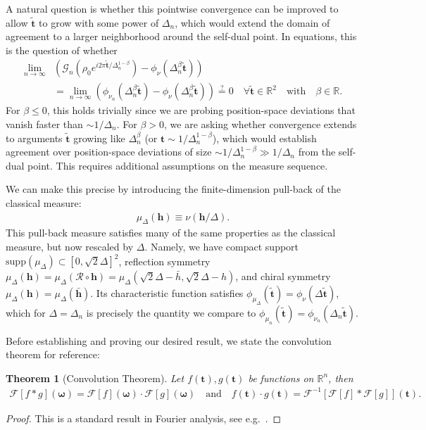 \documentclass[a4paper,11pt]{article}
\theoremstyle{plain}
\newtheorem{thm}{Theorem}[section]
\theoremstyle{definition}
\theoremstyle{remark}
\newcommand{\bs}[1]{\boldsymbol{#1}}
\newcommand{\ba}{\begin{equation} \begin{aligned}}
\newcommand{\ea}{\end{aligned} \end{equation}}
\newcommand{\De}{\Delta}
\begin{document}
A natural question is whether this pointwise convergence can be improved to allow $\tilde{\bs{t}}$ to grow with some power of $\De_n$, which would extend the domain of agreement to a larger neighborhood around the self-dual point. In equations, this is the question of whether
\ba
\lim_{n \to \infty} &\left(  \mathcal{G}_n(\rho_0 e^{i 2\pi \tilde{\bs{t}} / \De_n^{1-\beta} } )   - \phi_{\nu}(\De_n^{\beta}\tilde{\bs{t}})\right) \\ 
&=\lim_{n \to \infty} \left(  \phi_{\nu_n}(\De_n^{\beta}\tilde{ \bs{t}})  - \phi_{\nu}(\De_n^{\beta}\tilde{\bs{t}})\right)\stackrel{?}{=} 0 \quad \forall \tilde{\bs{t}} \in \mathbb{R}^2 \quad \text{with} \quad \beta \in \mathbb{R}.
\ea
For $\beta \leq0$, this holds trivially since we are probing position-space deviations that vanish faster than $\sim 1/\De_n$. For $\beta >0$, we are asking whether convergence extends to arguments $\tilde{\bs{t}}$ growing like $\De_n^{\beta}$ (or $\bs{t} \sim 1/\De_n^{1-\beta}$), which would establish agreement over position-space deviations of size $\sim 1/\De_n^{1-\beta} \gg 1/\De_n$ from the self-dual point. This requires additional assumptions on the measure sequence.

We can make this precise by introducing the finite-dimension pull-back of the classical measure:
\ba
\mu_{\De}(\bs{h}) \equiv \nu(\bs{h}/\De).
\ea
This pull-back measure satisfies many of the same properties as the classical measure, but now rescaled by $\Delta$. Namely, we have compact support $\mathrm{supp}(\mu_\Delta) \subset [0,\sqrt{2} \Delta]^2 $, reflection symmetry $\mu_\Delta(\bs{h}) = \mu_\Delta(\mathcal{R}\circ\bs{h}) = \mu_\Delta(\sqrt{2}\Delta - \bar{h},\sqrt{2}\De - h)$, and chiral symmetry $\mu_\Delta(\bs{h}) = \mu_\Delta(\bar{\bs{h}})$. Its characteristic function satisfies $\phi_{\mu_\De}(\tilde{\bs{t}}) = \phi_\nu(\De \tilde{\bs{t}})$, which for $\De = \De_n$ is precisely the quantity we compare to $\phi_{\mu_n}(\tilde{\bs{t}}) = \phi_{\nu_n}(\De_n \tilde{\bs{t}})$. 

Before establishing and proving our desired result, we state the convolution theorem for reference:
\begin{thm}[Convolution Theorem] 
\label{convthm}
Let $f(\bs{t}),g(\bs{t})$ be functions on $\mathbb{R}^n$, then
\ba
\mathcal{F}[f * g](\bs{\omega}) = \mathcal{F}[f](\bs{\omega}) \cdot \mathcal{F}[g](\bs{\omega}) \quad \text{and} \quad f(\bs{t})\cdot g(\bs{t}) = \mathcal{F}^{-1} [ \mathcal{F}[f] * \mathcal{F}[g]](\bs{t}).
\ea
\end{thm}
\begin{proof}
    This is a standard result in Fourier analysis, see e.g.~\cite{McGillemCooper1984}.
\end{proof}
\end{document}
